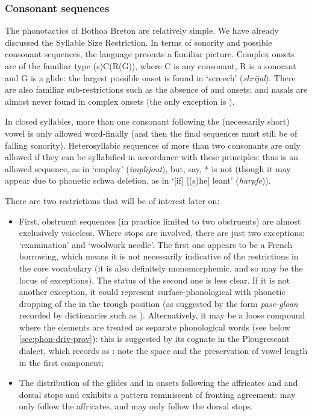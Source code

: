 \subsubsection{Consonant sequences}
\label{sec:consonant-sequences}

The phonotactics of Bothoa Breton are relatively simple. We have already discussed the Syllable Size Restriction. In terms of sonority and possible consonant sequences, the language presents a familiar picture. Complex onsets are of the familiar type (s)C(R(G)), where C is any consonant, R is a sonorant and G is a glide: the largest possible onset is found in  `screech' (\emph{skrijal}). There are also familiar sub-restrictions such as the absence of \ipa{[tl]} and \ipa{[dl]} onsets; and nasals are almost never found in complex onsets (the only exception is \ipa{[mn]}).

In closed syllables, more than one consonant following the (necessarily short) vowel is only allowed word-finally (and then the final sequences must still be of falling sonority). Heterosyllabic sequences of more than two consonants are only allowed if they can be syllabified in accordance with these principles: thus \ipa{[mpl]} is an allowed sequence, as in \ipa{[imˈpliːo]} `employ' (\emph{implijout}), but, say, *\ipa{[rpf]} is not (though it may appear due to phonetic schwa deletion, as in \ipa{[ˈharpfæ]} `[if] [(s)he] leant' (\emph{harpfe})).

There are two restrictions that will be of interest later on:

\begin{itemize}
\item First, obstruent sequences (in practice limited to two obstruents) are almost exclusively voiceless. Where stops are involved, there are just two exceptions:  `examination' and  `woolwork needle'. The first one appears to be a French borrowing, which means it is not necessarily indicative of the restrictions in the core vocabulary (it is also definitely monomorphemic, and so may be the locus of exceptions). The status of the second one is less clear. If it is not another exception, it could represent surface\hyp phonological \ipa{[ˌpazəˈɡlãːn]} with phonetic dropping of the \ipa{[ə]} in the trough position (as suggested by the form \emph{pase-gloan} recorded by dictionaries such as \citealp{favereau97:_geriad_diction,hemon05}). Alternatively, it may be a loose compound where the elements are treated as separate phonological words (see below \cref{sec:phon-driv-prov}): this is suggested by its cognate in the Plougrescant dialect, which \citet[\emph{s.~v.\@} \emph{gloan}]{le12:_le_ploug} records as : note the space and the preservation of vowel length in the first component;
\item The distribution of the glides \ipa{[w]} and \ipa{[ɥ]} in onsets following the affricates \ipa{[ʧ]} and \ipa{[dʒ]} and dorsal stops \ipa{[k]} and \ipa{[ɡ]} exhibits a pattern reminiscent of fronting agreement: \ipa{[ɥ]} may only follow the affricates, and \ipa{[w]} may only follow the dorsal stops.
\end{itemize}


